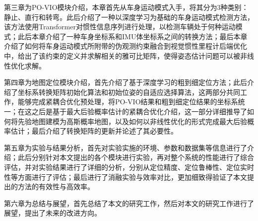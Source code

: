 第三章为PO-VIO模块介绍，本章首先从车身运动模式入手，将其分为3种类别：静止、直行和转弯。此后介绍了一种以深度学习为基础的车身运动模式检测方法，该方法使用Transformer\cite{vaswani2017attention}对惯性信息序列进行处理，以检测车辆处于何种运动模式；此后本章介绍了一种车身坐标系和IMU体坐标系之间的转换方法；最后本章介绍了如何将车身运动模式所附带的伪观测约束融合到视觉惯性里程计后端优化中，给出了该约束的定义并求解相关的雅可比矩阵，使得姿态估计问题可以被非线性优化求解。

第四章为地图定位模块介绍，首先介绍了基于深度学习的粗到细定位方法；此后介绍了坐标系转换矩阵初始化算法和初始位姿的自适应选择算法，这两部分共同工作，能够完成紧耦合优化预处理，将PO-VIO结果和粗到细定位结果的坐标系统一；在这之后是基于最大后验概率估计的紧耦合优化介绍，这一部分详细推导了如何将先验地图建模为高斯概率地图，以及如何以非线性优化的形式完成最大后验概率估计；最后介绍了转换矩阵的更新并论述了其必要性。

第五章为实验与结果分析，首先对实验实施的环境、参数和数据集等信息进行了介绍；此后分别针对本文提出的各个模块进行实验，再对整个系统的性能进行了综合评估，并对实验结果进行了详细的分析，分别从定位精度、定位鲁棒性、定位实时性等方面进行了评估；最后进行了消融实验与效率对比，更加细致得验证了本文提出的方法的有效性与高效率。

第六章为总结与展望，首先总结了本文的研究工作，然后对本文的研究工作进行了展望，提出了未来的改进方向。